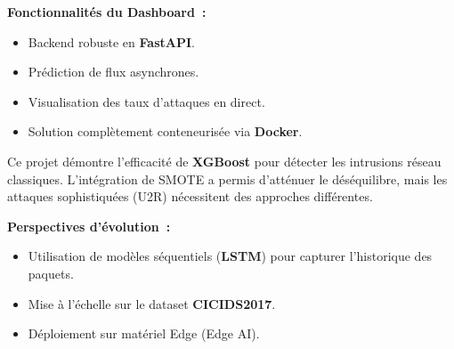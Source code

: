 \documentclass{article}
\newlength{\colW}  \setlength{\colW}{180mm}
\newcommand{\bodyfont}{\fontsize{16}{22}\selectfont}
\newcommand{\labelfont}{\fontsize{14}{18}\selectfont\bfseries}
\newcommand{\citem}[1]{\item[\textcolor{Secondary}{\faCaretRight}] #1}
\begin{document}
\begin{minipage}[t]{\colW}
\begin{tcolorbox}[pc, title={\faDesktop\; Dashboard Temps R\'eel}]
\begin{center}
\end{center}

\vspace{4mm}
{\labelfont\color{Primary}Fonctionnalit\'es du Dashboard~:}
\begin{itemize}[leftmargin=6mm, itemsep=1.5mm, topsep=2mm]
  \citem{Backend robuste en \textbf{FastAPI}.}
  \citem{Pr\'ediction de flux asynchrones.}
  \citem{Visualisation des taux d'attaques en direct.}
  \citem{Solution compl\`etement conteneuris\'ee via \textbf{Docker}.}
\end{itemize}
\end{tcolorbox}

\vspace{8mm}

\begin{tcolorbox}[pc, title={\faLightbulb\; Conclusion \& Perspectives}]
\bodyfont\color{TextMain}
Ce projet d\'emontre l'efficacit\'e de \textbf{XGBoost} pour d\'etecter les intrusions r\'eseau classiques. L'int\'egration de SMOTE a permis d'att\'enuer le d\'es\'equilibre, mais les attaques sophistiqu\'ees (U2R) n\'ecessitent des approches diff\'erentes.

\vspace{4mm}
{\labelfont\color{Primary}Perspectives d'\'evolution~:}
\begin{itemize}[leftmargin=6mm, itemsep=1.5mm, topsep=2mm]
  \citem{Utilisation de mod\`eles s\'equentiels (\textbf{LSTM}) pour capturer l'historique des paquets.}
  \citem{Mise \`a l'\'echelle sur le dataset \textbf{CICIDS2017}.}
  \citem{D\'eploiement sur mat\'eriel Edge (Edge AI).}
\end{itemize}
\end{tcolorbox}

\end{minipage}
\end{document}
